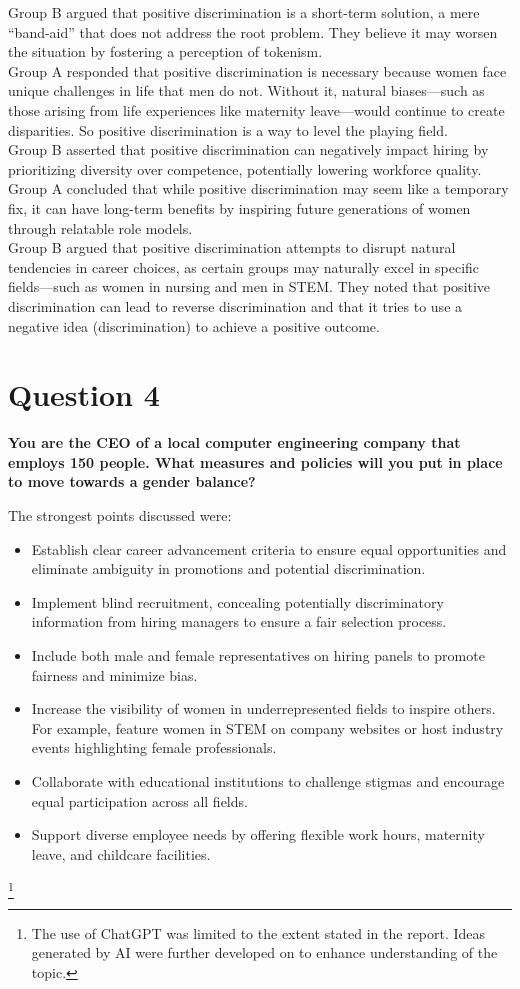 \documentclass[12pt]{article}
\begin{document}
Group B argued that positive discrimination is a short-term solution, a mere “band-aid” that does not address the root problem. They believe it may worsen the situation by fostering a perception of tokenism.\\

Group A responded that positive discrimination is necessary because women face unique challenges in life that men do not. Without it, natural biases—such as those arising from life experiences like maternity leave—would continue to create disparities. So positive discrimination is a way to level the playing field.\\

Group B asserted that positive discrimination can negatively impact hiring by prioritizing diversity over competence, potentially lowering workforce quality.\\

Group A concluded that while positive discrimination may seem like a temporary fix, it can have long-term benefits by inspiring future generations of women through relatable role models.\\

Group B argued that positive discrimination attempts to disrupt natural tendencies in career choices, as certain groups may naturally excel in specific fields—such as women in nursing and men in STEM. They noted that positive discrimination can lead to reverse discrimination and that it tries to use a negative idea (discrimination) to achieve a positive outcome.\\

\pagebreak
\section{Question 4}  
\textbf{You are the CEO of a local computer engineering company that employs 150 people. What measures and policies will you put in place to move towards a gender balance?}  

The strongest points discussed were:
\begin{itemize}
    \item Establish clear career advancement criteria to ensure equal opportunities and eliminate ambiguity in promotions and potential discrimination.
    \item Implement blind recruitment, concealing potentially discriminatory information from hiring managers to ensure a fair selection process.
    \item Include both male and female representatives on hiring panels to promote fairness and minimize bias.
    \item Increase the visibility of women in underrepresented fields to inspire others. For example, feature women in STEM on company websites or host industry events highlighting female professionals.
    \item Collaborate with educational institutions to challenge stigmas and encourage equal participation across all fields.
    \item Support diverse employee needs by offering flexible work hours, maternity leave, and childcare facilities.
\end{itemize}

\footnote{The use of ChatGPT was limited to the extent stated in the report. Ideas generated by AI were further developed on to enhance understanding of the topic.}


\end{document}
